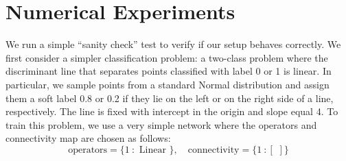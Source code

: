 \documentclass{article}
\begin{document}
\section{Numerical Experiments}\label{sec_numexp}
We run a simple ``sanity check'' test to verify if our setup behaves correctly.
We first consider a simpler classification problem: a two-class  problem where the discriminant line that separates  points classified with label 0 or 1 is  linear. 
In particular, we sample  points from a standard Normal distribution and assign them a soft label 0.8 or 0.2 if they lie on the left or on the right side of a  line, respectively.
The line is fixed with intercept in the origin and slope equal 4. 
To train this problem, we use a very simple network where the operators and connectivity map are chosen as follows:
\begin{equation*}
\text{operators} =  \{  1  \: :  \text{ Linear } \},
 \quad 
\text{connectivity} =  \{  1  \: : [\,\, ]  \}
\end{equation*}
\end{document}
